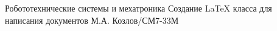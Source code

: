 
                {Робототехнические системы и мехатроника}
                {Создание \LaTeX{} класса для написания документов}
                {М.А. Козлов/СМ7-33М}
                {}
                {}
            